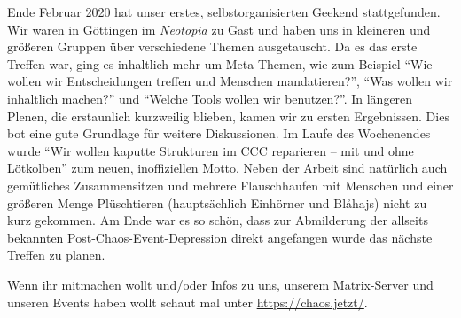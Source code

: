 \begin{DSarticle}[
    title={chaos.jetzt},
    author={dc7ia=lektorat@dc7ia.eu, ruru4143=ruru-cj-ds@r3.at, raketenlurch=raketenlurch@riseup.net}
    head=chaos.jetzt,
    tocentry=chaos.jetzt,
]
Ende Februar 2020 hat unser erstes, selbstorganisierten Geekend stattgefunden.
Wir waren in Göttingen im \emph{Neotopia} zu Gast und haben uns in kleineren und größeren Gruppen über verschiedene Themen ausgetauscht.
Da es das erste Treffen war, ging es inhaltlich mehr um Meta-Themen, wie zum Beispiel \enquote{Wie wollen wir Entscheidungen treffen und Menschen mandatieren?}, \enquote{Was wollen wir inhaltlich machen?} und \enquote{Welche Tools wollen wir benutzen?}.
In längeren Plenen, die erstaunlich kurzweilig blieben, kamen wir zu ersten Ergebnissen.
Dies bot eine gute Grundlage für weitere Diskussionen.
Im Laufe des Wochenendes wurde \enquote{Wir wollen kaputte Strukturen im CCC reparieren -- mit und ohne Lötkolben} zum neuen, inoffiziellen Motto.
Neben der Arbeit sind natürlich auch gemütliches Zusammensitzen und mehrere Flauschhaufen mit Menschen und einer größeren Menge Plüschtieren (hauptsächlich Einhörner und Blåhajs) nicht zu kurz gekommen.
Am Ende war es so schön, dass zur Abmilderung der allseits bekannten Post-Chaos-Event-Depression direkt angefangen wurde das nächste Treffen zu planen.

Wenn ihr mitmachen wollt und/oder Infos zu uns, unserem Matrix-Server und unseren Events haben wollt schaut mal unter \url{https://chaos.jetzt/}.





\end{DSarticle}
